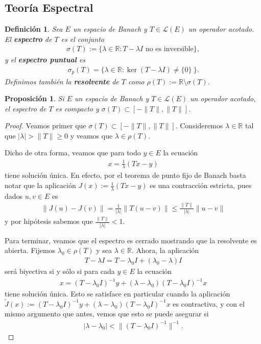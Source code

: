 \documentclass[11pt]{report}
\theoremstyle{colored}
\newtheorem{definition}{Definición}[section]
\newtheorem{proposition}{Proposición}[section]
\newcommand{\R}{\mathbb{R}}
\begin{document}
\subsection{Teoría Espectral}

\begin{definition} Sea $E$ un espacio de Banach y $T \in \mathscr{L}(E)$ un operador acotado.
El \textbf{espectro} de $T$ es el conjunto
\begin{align*}
\sigma(T) := \{\lambda \in \R : T-\lambda I \text{ no es inversible} \},
\end{align*}
y el \textbf{espectro puntual} es
\begin{align*}
\sigma_p(T) = \{\lambda \in \R : \ker(T-\lambda I) \neq \{0\} \ \}.
\end{align*}
Definimos también la \textbf{resolvente} de $T$ como $\rho(T) := \R \setminus \sigma(T)$.
\end{definition}

\begin{proposition} Si $E$ un espacio de Banach y $T \in \mathscr{L}(E)$ un operador acotado, el espectro de $T$ es compacto y $\sigma(T) \subset [-\|T\|,\|T\|]$.  
\end{proposition}
\begin{proof} Veamos primer que $\sigma(T) \subset [-\|T\|,\|T\|]$. Consideremos $\lambda \in \R$ tal que $|\lambda| > \|T\| \geq 0$ y veamos que $\lambda \in \rho(T)$.

Dicho de otra forma, veamos que para todo $y \in E$ la ecuación
\begin{align*}
x = \frac{1}{\lambda}(Tx - y)
\end{align*}
tiene solución única. En efecto, por el teorema de punto fijo de Banach basta notar que la aplicación $J(x) := \frac{1}{\lambda}(Tx-y)$ es una contracción estricta, pues dados $u,v \in E$ es
\begin{align*}
\|J(u)-J(v)\| = \frac{1}{|\lambda|}\|T(u-v)\| \leq \frac{\|T\|}{|\lambda|}\|u-v\|
\end{align*}
y por hipótesis sabemos que $\frac{\|T\|}{|\lambda|} < 1$.

Para terminar, veamos que el espectro es cerrado mostrando que la resolvente es abierta. Fijemos $\lambda_0 \in \rho(T)$ y sea $\lambda \in \R$. Ahora, la aplicación
\begin{align*}
T-\lambda I = T-\lambda_0 I + (\lambda_0 - \lambda)I
\end{align*} 
será biyectiva si y sólo si para cada $y \in E$ la ecuación 
\begin{align*}
x = (T-\lambda_0 I)^{-1}y + (\lambda-\lambda_0)(T-\lambda_0 I)^{-1}x
\end{align*}
tiene solución única. Esto se satisface en particular cuando la aplicación $\widetilde{J}(x) := (T-\lambda_0 I)^{-1}y + (\lambda-\lambda_0)(T-\lambda_0 I)^{-1}x$ es contractiva, y con el mismo argumento que antes, vemos que esto se puede asegurar si
\begin{align*}
|\lambda-\lambda_0| < \|(T-\lambda_0 I)^{-1}\|^{-1}.
\end{align*}
\end{proof}
\end{document}
